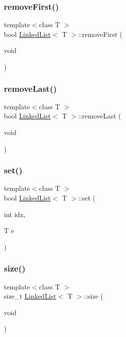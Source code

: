 \subsubsection{\texorpdfstring{remove\+First()}{removeFirst()}}
{\footnotesize\ttfamily template$<$class T $>$ \\
bool \hyperlink{class_linked_list}{Linked\+List}$<$ T $>$\+::remove\+First (\begin{DoxyParamCaption}\item[{void}]{ }\end{DoxyParamCaption})}

\mbox{\label{class_linked_list_a729c1b4800c3073d4089710ec24027bb}} 
\subsubsection{\texorpdfstring{remove\+Last()}{removeLast()}}
{\footnotesize\ttfamily template$<$class T $>$ \\
bool \hyperlink{class_linked_list}{Linked\+List}$<$ T $>$\+::remove\+Last (\begin{DoxyParamCaption}\item[{void}]{ }\end{DoxyParamCaption})}

\mbox{\label{class_linked_list_a3b4d7ca9e8efe65b20a08a6625269060}} 
\subsubsection{\texorpdfstring{set()}{set()}}
{\footnotesize\ttfamily template$<$class T $>$ \\
bool \hyperlink{class_linked_list}{Linked\+List}$<$ T $>$\+::set (\begin{DoxyParamCaption}\item[{int}]{idx,  }\item[{T}]{e }\end{DoxyParamCaption})}

\mbox{\label{class_linked_list_adce22d095b20331199fa9dcf4ff471e8}} 
\subsubsection{\texorpdfstring{size()}{size()}}
{\footnotesize\ttfamily template$<$class T $>$ \\
size\+\_\+t \hyperlink{class_linked_list}{Linked\+List}$<$ T $>$\+::size (\begin{DoxyParamCaption}\item[{void}]{ }\end{DoxyParamCaption})}



